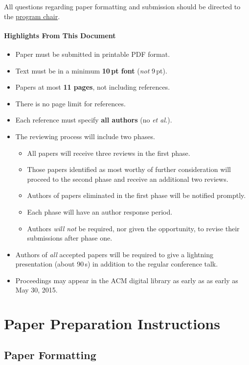 \documentclass[pldi]{sigplanconf-pldi15}
\begin{document}
All questions regarding paper formatting and submission should be
directed to the
\href{mailto:emery@cs.umass.edu?subject=[PLDI'15]}{program
  chair}.

\paragraph{Highlights From This Document}
\begin{itemize}[noitemsep]
\item Paper must be submitted in printable PDF format.
\item Text must be in a minimum \textbf{10\,pt font} (\emph{not} 9\,pt).
\item Papers at most \textbf{11 pages}, not including references. 
\item There is no page limit for references. 
\item Each reference must specify \textbf{all authors} (no \emph{et al.}). 
\item The reviewing process will include two phases.
  \begin{itemize}
  \item All papers will receive three reviews in the first phase.
  \item Those papers identified as most worthy of further consideration will proceed to the second phase and receive an additional two reviews.
  \item Authors of papers eliminated in the first phase will be notified promptly.
  \item Each phase will have an author response period.
  \item Authors \emph{will not} be required, nor given the opportunity, to revise their submissions after phase one.
  \end{itemize}
\item Authors of \emph{all} accepted papers will be required to give a
  lightning presentation (about 90\,s) in addition to
  the regular conference talk.
\item Proceedings may appear in the ACM digital library as early as as early as May 30, 2015.
\end{itemize} 



\section{Paper Preparation Instructions}

\subsection{Paper Formatting}
\end{document}
